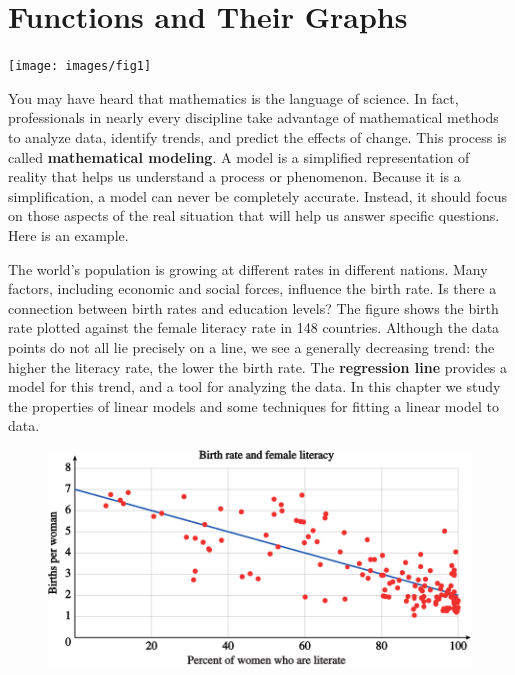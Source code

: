 \documentclass[10pt,]{book}
\newcommand{\terminology}[1]{\textbf{#1}}
\theoremstyle{plain}
\theoremstyle{definition}
\theoremstyle{definition}
\theoremstyle{definition}
\theoremstyle{definition}
\numberwithin{equation}{part}
\begin{document}
\chapter[{Functions and Their Graphs}]{Functions and Their Graphs}\label{chap1}
\typeout{************************************************}
\typeout{************************************************}
\texttt{[image: images/fig1]}
%
\par
You may have heard that mathematics is the language of science.  In fact, professionals in nearly every discipline take advantage of mathematical methods to analyze data, identify trends, and predict the effects of change.  This process is called \terminology{mathematical modeling}.  A model is a simplified representation of reality that helps us understand a process or phenomenon.  Because it is a simplification, a model can never be completely accurate.  Instead, it should focus on those aspects of the real situation that will help us answer specific questions. Here is an example.%
\par
The world's population is growing at different rates in different nations.  Many factors, including economic and social forces, influence the birth rate.  Is there a connection between birth rates and education levels?  The figure shows the birth rate plotted against the female literacy rate in 148 countries.  Although the data points do not all lie precisely on a line, we see a generally decreasing trend:  the higher the literacy rate, the lower the birth rate.  The \terminology{regression line} provides a model for this trend, and a tool for analyzing the data.  In this chapter we study the properties of linear models and some techniques for fitting a linear model to data.%
\begin{figure}
\centering
\includegraphics[width=1\linewidth]{images/BirthRateVsFemaleLiteracy}
\end{figure}
\end{document}
